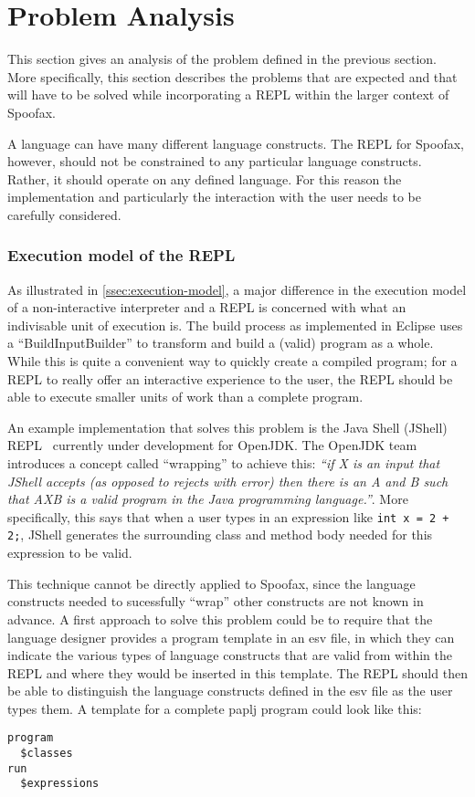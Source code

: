 \section{Problem Analysis}
\label{sec:problem-analysis}

This section gives an analysis of the problem defined in the previous section.
More specifically, this section describes the problems that are expected and
that will have to be solved while incorporating a REPL
within the larger context of Spoofax.

A language can have many different language constructs. The REPL for Spoofax,
however, should not be constrained to any particular language constructs.
Rather, it should operate on any defined language. For this reason the
implementation and particularly the interaction with the user needs to be
carefully considered.

\subsubsection{Execution model of the REPL}
\label{ssec:execution-model-repl}
As illustrated in \cref{ssec:execution-model}, a major difference in the
execution model of a non-interactive interpreter and a REPL is concerned with
what an indivisable unit of execution is. The build process as implemented in
Eclipse uses a ``BuildInputBuilder'' to transform and build a (valid) program
as a whole. While this is quite a convenient way to quickly create a compiled
program; for a REPL to really offer an interactive experience to the user, the
REPL should be able to execute smaller units of work than a complete program.

An example implementation that solves this problem is the Java Shell (JShell)
REPL~\cite{jshell-repl} currently under development for OpenJDK. The OpenJDK
team introduces a concept called ``wrapping'' to achieve this: \textit{``if X
is an input that JShell accepts (as opposed to rejects with error) then there
is an A and B such that AXB is a valid program in the Java programming
language.''}. More specifically, this says that when a user types in an
expression like \texttt{int x = 2 + 2;}, JShell generates the surrounding class and
method body needed for this expression to be valid.

This technique cannot be directly applied to Spoofax, since the language
constructs needed to sucessfully ``wrap'' other constructs are not known in
advance. A first approach to solve this problem could be to require that the
language designer provides a program template in an esv file, in which they can
indicate the various types of language constructs that are valid from within
the REPL and where they would be inserted in this template. The REPL should
then be able to distinguish the language constructs defined in the esv file as
the user types them. A template for a complete paplj program could look like
this:
\begin{lstlisting}
program
  $classes
run
  $expressions
\end{lstlisting}

